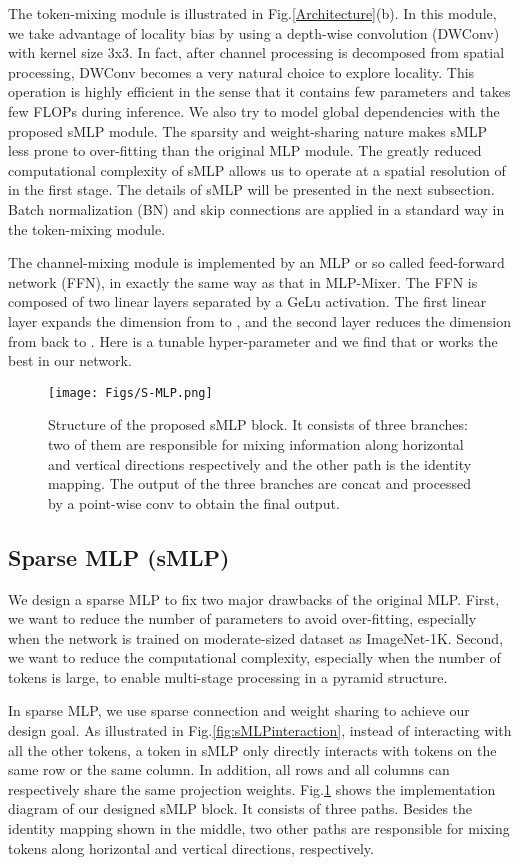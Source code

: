 \documentclass[letterpaper]{article} \usepackage{aaai22}  \usepackage{times}  \usepackage{helvet}  \usepackage{courier}  \usepackage[hyphens]{url}  \usepackage{graphicx} \usepackage{color}
\begin{document}
The token-mixing module is illustrated in Fig.\ref{Architecture}(b). In this module, we take advantage of locality bias by using a depth-wise convolution (DWConv) with kernel size 3x3. In fact, after channel processing is decomposed from spatial processing, DWConv becomes a very natural choice to explore locality. This operation is highly efficient in the sense that it contains few parameters and takes few FLOPs during inference. We also try to model global dependencies with the proposed sMLP module. The sparsity and weight-sharing nature makes sMLP less prone to over-fitting than the original MLP module. The greatly reduced computational complexity of sMLP allows us to operate at a spatial resolution of  in the first stage. The details of sMLP will be presented in the next subsection. Batch normalization (BN) and skip connections are applied in a standard way in the token-mixing module. 

The channel-mixing module is implemented by an MLP or so called feed-forward network (FFN), in exactly the same way as that in MLP-Mixer. The FFN is composed of two linear layers separated by a GeLu activation. The first linear layer expands the dimension from  to , and the second layer reduces
the dimension from  back to . Here  is a tunable hyper-parameter and we find that  or  works the best in our network. 

\begin{figure}[t]
\centering
\texttt{[image: Figs/S-MLP.png]} \caption{Structure of the proposed sMLP block. It consists of three branches: two of them are responsible for mixing information along horizontal and vertical directions respectively and the other path is the identity mapping. The output of the three branches are concat and processed by a point-wise conv to obtain the final output.}
\label{fig:sMLP}
\end{figure}


\subsection{Sparse MLP (sMLP)}
We design a sparse MLP to fix two major drawbacks of the original MLP. First, we want to reduce the number of parameters to avoid over-fitting, especially when the network is trained on moderate-sized dataset as ImageNet-1K. Second, we want to reduce the computational complexity, especially when the number of tokens is large, to enable multi-stage processing in a pyramid structure. 

In sparse MLP, we use sparse connection and weight sharing to achieve our design goal. As illustrated in Fig.\ref{fig:sMLPinteraction}, instead of interacting with all the other tokens, a token in sMLP only directly interacts with tokens on the same row or the same column. In addition, all rows and all columns can respectively share the same projection weights. Fig.\ref{fig:sMLP} shows the implementation diagram of our designed sMLP block. It consists of three paths. Besides the identity mapping shown in the middle, two other paths are responsible for mixing tokens along horizontal and vertical directions, respectively. 
\end{document}
